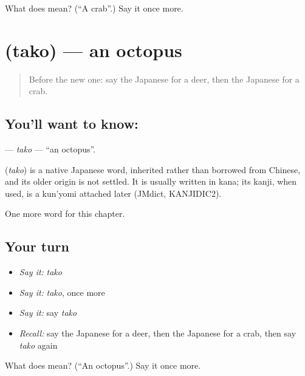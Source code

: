 \begin{tcolorbox}[breakable,colback=teal!4,colframe=teal!35!black,title={Before you move on}]
What does  mean? (\textquotedblleft{}A crab\textquotedblright{}.) Say it once more.
\end{tcolorbox}
\section[\texorpdfstring{\ja{たこ} (tako)}{たこ (tako)}]{ (tako) — an octopus}

\label{lesson:JA-C47-tako}



\begin{quote}
Before the new one: say the Japanese for a deer, then the Japanese for a crab.
\end{quote}

\subsection*{You'll want to know: }
\textbf{} — \emph{tako} — \textquotedblleft{}an octopus\textquotedblright{}.

\begin{cousinweb}
\textbf{} (\emph{tako}) is a native Japanese word, inherited rather than borrowed from Chinese, and its older origin is not settled. It is usually written in kana; its kanji, when used, is a kun'yomi attached later (JMdict, KANJIDIC2).
\end{cousinweb}

\begin{grammarlens}[title={What you've built}]
One more word for this chapter.
\end{grammarlens}

\subsection*{Your turn}
\begin{itemize}
\raggedright
  \item \emph{Say it:} \emph{tako}
  \item \emph{Say it:} \emph{tako}, once more
  \item \emph{Say it:} say \emph{tako}
  \item \emph{Recall:} say the Japanese for a deer, then the Japanese for a crab, then say \emph{tako} again
\end{itemize}

\begin{tcolorbox}[breakable,colback=teal!4,colframe=teal!35!black,title={Before you move on}]
What does  mean? (\textquotedblleft{}An octopus\textquotedblright{}.) Say it once more.
\end{tcolorbox}
